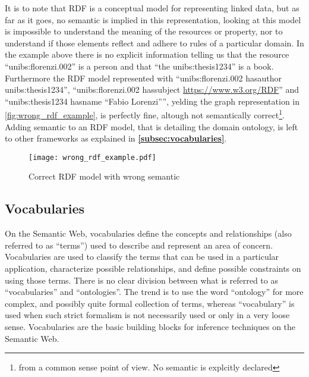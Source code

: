 It is to note that RDF is a conceptual model for representing linked data, but as far as it goes, no semantic is implied in this representation, looking at this model is impossible to understand the meaning of the resources or property, nor to understand if those elements reflect and adhere to rules of a particular domain.
In the example above there is no explicit information telling us that the resource ``unibs:florenzi.002'' is a person and that ``the unibs:thesis1234'' is a book. Furthermore the RDF model represented with ``unibs:florenzi.002 has\textunderscore author unibs:thesis1234'', ``unibs:florenzi.002 has\textunderscore subject \url{https://www.w3.org/RDF}'' and ``unibs:thesis1234   has\textunderscore name ``Fabio Lorenzi'''', yelding the graph representation in \autoref{fig:wrong_rdf_example}, is perfectly fine, altough not semantically correct\footnote{from a common sense point of view. No semantic is explcitly declared}.
Adding semantic to an RDF model, that is detailing the domain ontology, is left to other frameworks as explained in \textbf{\autoref{subsec:vocabularies}}.

\begin{figure}
  \centering
  \texttt{[image: wrong\_rdf\_example.pdf]}
  \caption{Correct RDF model with wrong semantic}
  \label{fig:wrong_rdf_example}
\end{figure}

\subsection{Vocabularies} \label{subsec:vocabularies}
On the Semantic Web, vocabularies define the concepts and relationships (also referred to as ``terms'') used to describe and represent an area of concern. Vocabularies are used to classify the terms that can be used in a particular application, characterize possible relationships, and define possible constraints on using those terms. There is no clear division between what is referred to as ``vocabularies'' and ``ontologies''. The trend is to use the word ``ontology'' for more complex, and possibly quite formal collection of terms, whereas ``vocabulary'' is used when such strict formalism is not necessarily used or only in a very loose sense. Vocabularies are the basic building blocks for inference techniques on the Semantic Web.

